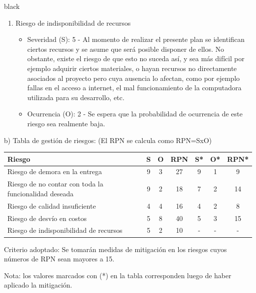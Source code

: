 \documentclass[
11pt, %
]{charter}
\begin{document}
\begin{consigna}{black}
\begin{enumerate}
\item Riesgo de indisponibilidad de recursos
\begin{itemize}
	\item Severidad (S): 5 - Al momento de realizar el presente plan se identifican ciertos recursos y se asume que será posible disponer de ellos. No obstante, existe el riesgo de que esto no suceda así, y sea más difícil por ejemplo adquirir ciertos materiales, o hayan recursos no directamente asociados al proyecto pero cuya ausencia lo afectan, como por ejemplo fallas en el acceso a internet, el mal funcionamiento de la computadora utilizada para su desarrollo, etc.
	\item Ocurrencia (O): 2 - Se espera que la probabilidad de ocurrencia de este riesgo sea realmente baja.
\end{itemize}

\end{enumerate}

b) Tabla de gestión de riesgos:      (El RPN se calcula como RPN=SxO)

\begin{table}[htpb]
\centering
\begin{tabularx}{\linewidth}{@{}|X|c|c|c|c|c|c|@{}}
\hline
\rowcolor[HTML]{C0C0C0}
Riesgo 													& S & O & RPN & S* & O* & RPN* \\ \hline
Riesgo de demora en la entrega							& 9 & 3 & 27 &  9  &  1  & 9    \\ \hline
Riesgo de no contar con toda la funcionalidad deseada	& 9 & 2 & 18  & 7  & 2 &  14    \\ \hline
Riesgo de calidad insuficiente							& 4 & 4 & 16 &  4 &  2 &   8  \\ \hline
Riesgo de desvío en costos								& 5 & 8 & 40 & 5  & 3  &  15   \\ \hline
Riesgo de indisponibilidad de recursos					& 5 & 2 & 10 & -  & -  &   -   \\ \hline
\end{tabularx}%
\end{table}

Criterio adoptado:
Se tomarán medidas de mitigación en los riesgos cuyos números de RPN sean mayores a 15.

Nota: los valores marcados con (*) en la tabla corresponden luego de haber aplicado la mitigación.


\end{consigna}
\end{document}
